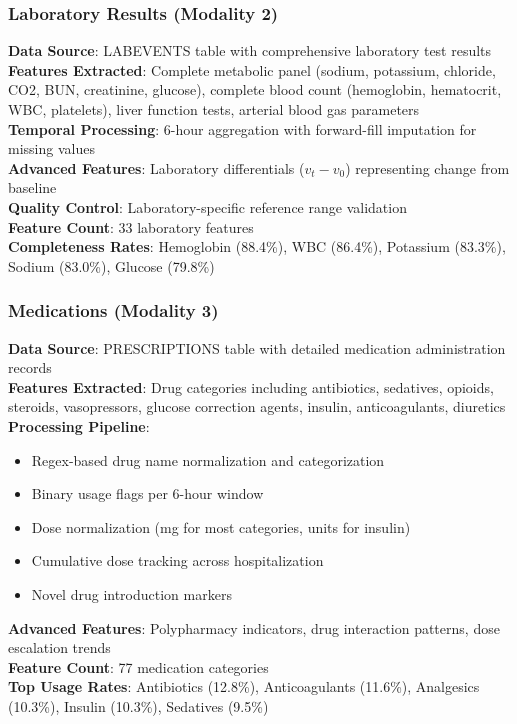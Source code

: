 \documentclass[11pt]{article}
\begin{document}
\subsubsection{Laboratory Results (Modality 2)}
\textbf{Data Source}: LABEVENTS table with comprehensive laboratory test results
\\
\textbf{Features Extracted}: Complete metabolic panel (sodium, potassium, chloride, CO2, BUN, creatinine, glucose), complete blood count (hemoglobin, hematocrit, WBC, platelets), liver function tests, arterial blood gas parameters
\\
\textbf{Temporal Processing}: 6-hour aggregation with forward-fill imputation for missing values
\\
\textbf{Advanced Features}: Laboratory differentials ($v_t - v_0$) representing change from baseline
\\
\textbf{Quality Control}: Laboratory-specific reference range validation
\\
\textbf{Feature Count}: 33 laboratory features
\\
\textbf{Completeness Rates}: Hemoglobin (88.4\%), WBC (86.4\%), Potassium (83.3\%), Sodium (83.0\%), Glucose (79.8\%)

\subsubsection{Medications (Modality 3)}
\textbf{Data Source}: PRESCRIPTIONS table with detailed medication administration records
\\
\textbf{Features Extracted}: Drug categories including antibiotics, sedatives, opioids, steroids, vasopressors, glucose correction agents, insulin, anticoagulants, diuretics
\\
\textbf{Processing Pipeline}: 
\begin{itemize}
    \item Regex-based drug name normalization and categorization
    \item Binary usage flags per 6-hour window
    \item Dose normalization (mg for most categories, units for insulin)
    \item Cumulative dose tracking across hospitalization
    \item Novel drug introduction markers
\end{itemize}
\textbf{Advanced Features}: Polypharmacy indicators, drug interaction patterns, dose escalation trends
\\
\textbf{Feature Count}: 77 medication categories
\\
\textbf{Top Usage Rates}: Antibiotics (12.8\%), Anticoagulants (11.6\%), Analgesics (10.3\%), Insulin (10.3\%), Sedatives (9.5\%)
\end{document}
